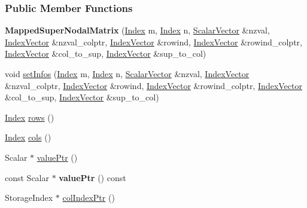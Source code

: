 \subsubsection*{Public Member Functions}
\begin{DoxyCompactItemize}
\item 
\mbox{\label{group___sparse_l_u___module_a3bd8587a1c75dc90e5403322ee85bd7f}} 
{\bfseries Mapped\+Super\+Nodal\+Matrix} (\hyperlink{namespace_eigen_a62e77e0933482dafde8fe197d9a2cfde}{Index} m, \hyperlink{namespace_eigen_a62e77e0933482dafde8fe197d9a2cfde}{Index} n, \hyperlink{group___core___module}{Scalar\+Vector} \&nzval, \hyperlink{group___core___module}{Index\+Vector} \&nzval\+\_\+colptr, \hyperlink{group___core___module}{Index\+Vector} \&rowind, \hyperlink{group___core___module}{Index\+Vector} \&rowind\+\_\+colptr, \hyperlink{group___core___module}{Index\+Vector} \&col\+\_\+to\+\_\+sup, \hyperlink{group___core___module}{Index\+Vector} \&sup\+\_\+to\+\_\+col)
\item 
void \hyperlink{group___sparse_l_u___module_af1427486564e2c75b9da68f98bd04e63}{set\+Infos} (\hyperlink{namespace_eigen_a62e77e0933482dafde8fe197d9a2cfde}{Index} m, \hyperlink{namespace_eigen_a62e77e0933482dafde8fe197d9a2cfde}{Index} n, \hyperlink{group___core___module}{Scalar\+Vector} \&nzval, \hyperlink{group___core___module}{Index\+Vector} \&nzval\+\_\+colptr, \hyperlink{group___core___module}{Index\+Vector} \&rowind, \hyperlink{group___core___module}{Index\+Vector} \&rowind\+\_\+colptr, \hyperlink{group___core___module}{Index\+Vector} \&col\+\_\+to\+\_\+sup, \hyperlink{group___core___module}{Index\+Vector} \&sup\+\_\+to\+\_\+col)
\item 
\hyperlink{namespace_eigen_a62e77e0933482dafde8fe197d9a2cfde}{Index} \hyperlink{group___sparse_l_u___module_a5cc8f3887a09bd7d078a6744c158b5a0}{rows} ()
\item 
\hyperlink{namespace_eigen_a62e77e0933482dafde8fe197d9a2cfde}{Index} \hyperlink{group___sparse_l_u___module_a57b3811f03be2d94c0cdd105aba1b932}{cols} ()
\item 
Scalar $\ast$ \hyperlink{group___sparse_l_u___module_a6e9ce7d448b76811802d11baf3da97d3}{value\+Ptr} ()
\item 
\mbox{\label{group___sparse_l_u___module_a3edbda057db71bc0ad442029cf2d0f2d}} 
const Scalar $\ast$ {\bfseries value\+Ptr} () const
\item 
Storage\+Index $\ast$ \hyperlink{group___sparse_l_u___module_a87c0272aedd8ee01d4245bd719738b5d}{col\+Index\+Ptr} ()

\end{DoxyCompactItemize}
